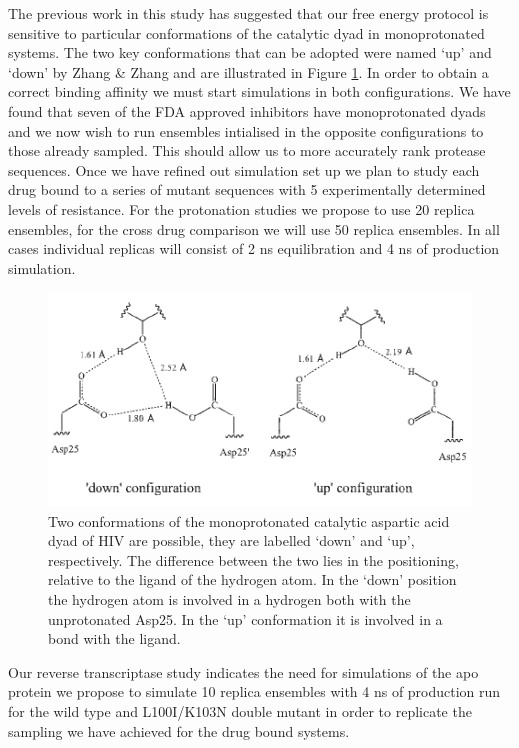 \documentclass[a4paper,10pt]{article}
\begin{document}
The previous work in this study has suggested that our free energy protocol is sensitive to particular 
conformations of the catalytic dyad in monoprotonated systems. The two key conformations that can be 
adopted were named `up' and `down' by Zhang \& Zhang \cite{Zhang} and are illustrated in 
Figure \ref{fig:asp_conf}. In order to obtain a correct binding affinity we must start simulations in 
both configurations. We have found that seven of the FDA approved inhibitors have monoprotonated 
dyads and we now wish to run ensembles intialised in the opposite configurations to those already sampled.
This should allow us to more accurately rank protease sequences. Once we have refined out simulation set up
we plan to study each drug bound to a series of mutant sequences with 5 experimentally determined levels 
of resistance. For the protonation studies we propose to use 20 replica ensembles, for the cross drug comparison
we will use 50 replica ensembles. In all cases individual replicas will consist of 2 ns equilibration and 4 
ns of production simulation.

\begin{figure}
  \begin{center}
    \includegraphics[]{asp_conf}
    \caption{Two conformations of the monoprotonated catalytic aspartic acid dyad of HIV are possible, they are labelled `down' and `up', respectively. The difference between the two lies in the positioning, relative to the ligand of the hydrogen atom. In the `down' position the hydrogen atom is involved in a hydrogen both with the unprotonated Asp25. In the `up' conformation it is involved in a bond with the ligand.}
    \label{fig:asp_conf} 
  \end{center}
\end{figure}

Our reverse transcriptase study indicates the need for simulations of the apo protein we propose to simulate 
10 replica ensembles with 4 ns of production run for the wild type and L100I/K103N double mutant in order to 
replicate the sampling we have achieved for the drug bound systems. 
\end{document}
